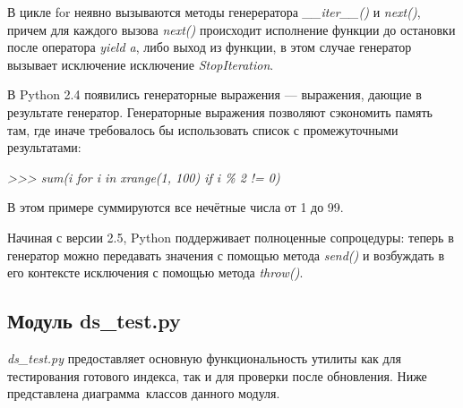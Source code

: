 В цикле for неявно вызываются методы генерератора \textit{\_\_iter\_\_()} и \textit{next()},
причем для каждого вызова \textit{next()} происходит исполнение функции до остановки после 
оператора \textit{yield a}, либо выход из функции, в этом случае генератор 
вызывает исключение исключение \textit{StopIteration}.

В Python 2.4 появились генераторные выражения — выражения, дающие в результате генератор. 
Генераторные выражения позволяют сэкономить память там, где иначе требовалось бы использовать список с промежуточными результатами:

\textit{ >>> sum(i for i in xrange(1, 100) if i \% 2 != 0)}

В этом примере суммируются все нечётные числа от 1 до 99.

Начиная с версии 2.5, Python поддерживает полноценные сопроцедуры: теперь в генератор можно передавать значения 
с помощью метода \textit{send()} и возбуждать в его контексте исключения с помощью метода \textit{throw()}.

\subsection{Модуль ds\_test.py}
\textit{ds\_test.py} предоставляет основную функциональность утилиты  как для тестирования
готового индекса, так и для проверки после обновления. Ниже представлена диаграмма~классов данного модуля.\\

